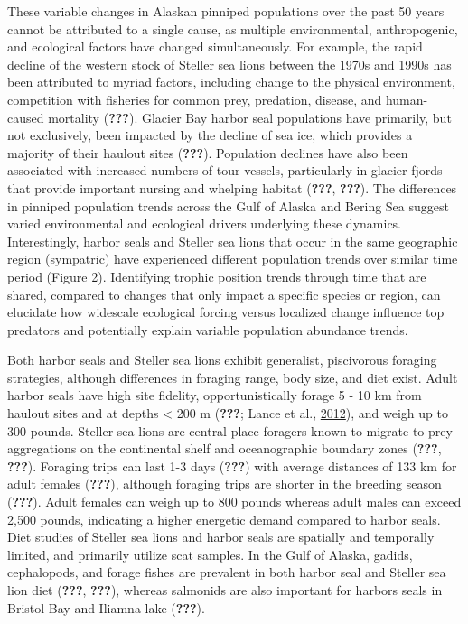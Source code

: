 \documentclass [11pt, proquest] {uwthesis}[2015/03/03]
\begin{document}
These variable changes in Alaskan pinniped populations over the past 50
years cannot be attributed to a single cause, as multiple environmental,
anthropogenic, and ecological factors have changed simultaneously. For
example, the rapid decline of the western stock of Steller sea lions
between the 1970s and 1990s has been attributed to myriad factors,
including change to the physical environment, competition with fisheries
for common prey, predation, disease, and human-caused mortality
({\textbf{???}}). Glacier Bay harbor seal populations have primarily,
but not exclusively, been impacted by the decline of sea ice, which
provides a majority of their haulout sites ({\textbf{???}}). Population
declines have also been associated with increased numbers of tour
vessels, particularly in glacier fjords that provide important nursing
and whelping habitat ({\textbf{???}}, {\textbf{???}}). The differences
in pinniped population trends across the Gulf of Alaska and Bering Sea
suggest varied environmental and ecological drivers underlying these
dynamics. Interestingly, harbor seals and Steller sea lions that occur
in the same geographic region (sympatric) have experienced different
population trends over similar time period (Figure 2). Identifying
trophic position trends through time that are shared, compared to
changes that only impact a specific species or region, can elucidate how
widescale ecological forcing versus localized change influence top
predators and potentially explain variable population abundance trends.

Both harbor seals and Steller sea lions exhibit generalist, piscivorous
foraging strategies, although differences in foraging range, body size,
and diet exist. Adult harbor seals have high site fidelity,
opportunistically forage 5 - 10 km from haulout sites and at depths
\textless{} 200 m ({\textbf{???}}; Lance et al.,
\protect\hyperlink{ref-Lance2012}{2012}), and weigh up to 300 pounds.
Steller sea lions are central place foragers known to migrate to prey
aggregations on the continental shelf and oceanographic boundary zones
({\textbf{???}}, {\textbf{???}}). Foraging trips can last 1-3 days
({\textbf{???}}) with average distances of 133 km for adult females
({\textbf{???}}), although foraging trips are shorter in the breeding
season ({\textbf{???}}). Adult females can weigh up to 800 pounds
whereas adult males can exceed 2,500 pounds, indicating a higher
energetic demand compared to harbor seals. Diet studies of Steller sea
lions and harbor seals are spatially and temporally limited, and
primarily utilize scat samples. In the Gulf of Alaska, gadids,
cephalopods, and forage fishes are prevalent in both harbor seal and
Steller sea lion diet ({\textbf{???}}, {\textbf{???}}), whereas
salmonids are also important for harbors seals in Bristol Bay and
Iliamna lake ({\textbf{???}}).
\end{document}
